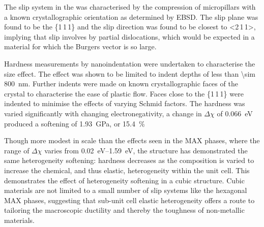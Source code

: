 The slip system in the  was characterised by the compression of micropillars with a known crystallographic orientation as determined by EBSD. The slip plane was found to be the \{1\,1\,1\} and the slip direction was found to be closest to <2\,1\,1>, implying that slip involves by partial dislocations, which would be expected in a material for which the Burgers vector is so large.

Hardness measurements by nanoindentation were undertaken to characterise the size effect. The effect was shown to be limited to indent depths of less than \SI{\sim 800}{\nano\meter}. Further indents were made on known crystallographic faces of the crystal to characterise the ease of plastic flow. Faces close to the \{1\,1\,1\} were indented to minimise the effects of varying Schmid factors. The hardness was varied significantly with changing electronegativity, a change in $\Delta \chi$ of \SI{0.066}{\electronvolt} produced a softening of \SI{1.93}{\giga\pascal}, or \SI{15.4}{\percent} 

Though more modest in scale than the effects seen in the MAX phases, where the range of $\Delta \chi$ varies from \SIrange{0.02}{1.59}{\electronvolt}, the  structure has demonstrated the same heterogeneity softening: hardness decreases as the composition is varied to increase the chemical, and thus elastic, heterogeneity within the unit cell. This demonstrates the effect of heterogeneity softening in a cubic structure. Cubic materials are not limited to a small number of slip systems like the hexagonal MAX phases, suggesting that sub-unit cell elastic heterogeneity offers a route to tailoring the  macroscopic ductility and thereby the toughness of non-metallic materials.
















































